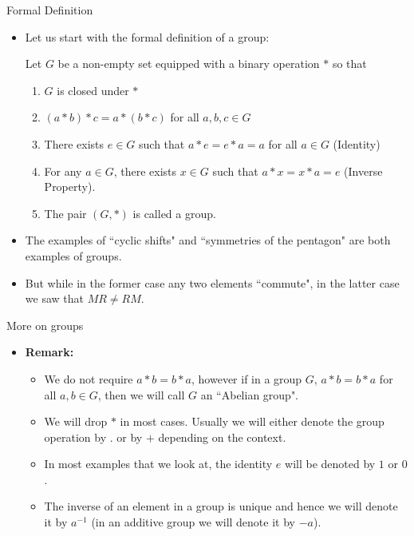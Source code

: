 \documentclass[ %
 10pt, xcolor={dvipsnames,svgnames,x11names,hyperref},
   hyperref={colorlinks=true,citecolor=green,linkcolor=DarkRed,urlcolor=ProcessBlue,anchorcolor=blue}
  ]{beamer}
\newenvironment{stepitemize}{\begin{itemize}[<+->]}{\end{itemize} }
\begin{document}
\begin{frame}{Formal Definition}
\begin{stepitemize}
    \item Let us start with the formal definition of a group:
 \begin{definition}
Let $G$ be a non-empty set equipped with a binary operation $*$ so that
\begin{enumerate}
    \item $G$ is closed under $*$
    \item $(a*b)*c=a*(b*c)$ for all $a,b,c \in G$
    \item There exists $e\in G$ such that $a*e=e*a=a$ for all $a \in G$ (Identity)
    \item For any $a\in G$, there exists $x\in G$ such that $a*x=x*a=e$ (Inverse Property).
    \item []The pair $(G, *)$ is called a group.
\end{enumerate}
\end{definition}
\item The examples of ``cyclic shifts" and ``symmetries of the pentagon" are both examples of groups.
\item But while in the former case any two elements ``commute", in the latter case we saw that $MR\neq RM$.
\end{stepitemize}
\end{frame}
\begin{frame}{More on groups}
\begin{stepitemize}
\item []{\bf Remark:}
\begin{itemize}
    \item We do not require $a*b=b*a$, however if in a group $G$, $a*b=b*a$ for all $a,b\in G$, then we will call $G$ an ``Abelian group".
    \item We will drop $*$ in most cases. Usually we will either denote the group operation by $.$ or by $+$ depending on the context.
    \item In most examples that we look at, the identity $e$ will be denoted by $1$ or $0$.
    \item The inverse of an element in a group is unique and hence we will denote it by $a^{-1}$ (in an additive group we will denote it by $-a$).
\end{itemize}
\end{stepitemize}

\end{frame}
\end{document}
